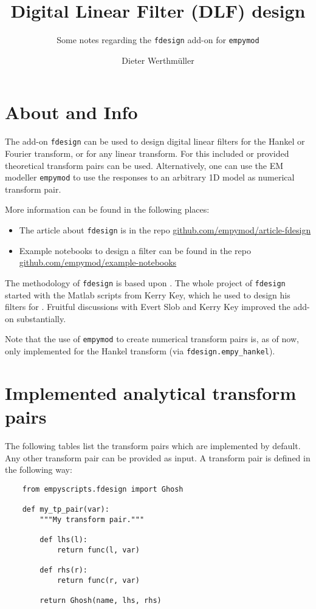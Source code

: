 \documentclass[fontsize=9pt, parskip=half, notitlepage, fleqn]{scrartcl}
\title{Digital Linear Filter (DLF) design}
\author{Dieter Werthmüller}
\subtitle{Some notes regarding the \texttt{fdesign} add-on for \texttt{empymod}}
\begin{document}
\maketitle

\section{About and Info}

The add-on \texttt{fdesign} can be used to design digital linear filters for
the Hankel or Fourier transform, or for any linear transform. For this included
or provided theoretical transform pairs can be used. Alternatively, one can use
the EM modeller \texttt{empymod} \citep{GEO.17.Werthmuller} to use the
responses to an arbitrary 1D model as numerical transform pair.

More information can be found in the following places:

\begin{itemize}
  \item The article about \texttt{fdesign} is in the repo
    \href{https://github.com/empymod/article-fdesign}{github.com/empymod/article-fdesign}
  \item Example notebooks to design a filter can be found in the repo
    \href{https://github.com/empymod/example-notebooks}{github.com/empymod/example-notebooks}
\end{itemize}


The methodology of \texttt{fdesign} is based upon \cite{GP.07.Kong}. The whole
project of \texttt{fdesign} started with the Matlab scripts from Kerry Key,
which he used to design his filters for \cite{GEO.09.Key, GEO.12.Key}. Fruitful
discussions with Evert Slob and Kerry Key improved the add-on substantially.

Note that the use of \texttt{empymod} to create numerical transform pairs is,
as of now, only implemented for the Hankel transform (via
\texttt{fdesign.empy\_hankel}).

\section{Implemented analytical transform pairs}

The following tables list the transform pairs which are implemented by default.
Any other transform pair can be provided as input. A transform pair is defined
in the following way:
\begin{verbatim}
    from empyscripts.fdesign import Ghosh

    def my_tp_pair(var):
        """My transform pair."""

        def lhs(l):
            return func(l, var)

        def rhs(r):
            return func(r, var)

        return Ghosh(name, lhs, rhs)
\end{verbatim}
\end{document}
